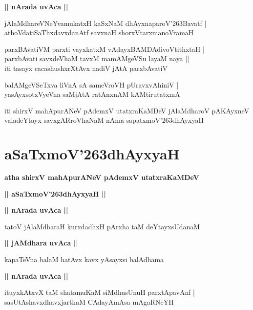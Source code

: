 \documentclass[twoside,12pt,openright]{book}
\def\S{\char'263}
\newcounter{shloka}[chapter]
\def\uvaca#1{\centerline{{\large\textbf{#1}}}}
\begin{document}
\uvaca{|| nArada uvAca ||}

\begin{shloka}%
jAlaMdhareVNeYvamukatxH kaSxNaM dhAyxnaparoV\S Bavatf |\\
athoVdatiSaThxdavxdanAtf savxnaH shorxVtarxmanoVramaH
\end{shloka}

\begin{shloka}%
parxBAvatiVM parxti vayxkatxM vAdayxBAMDAdivoVtithxtaH |\\
parxbAvati savxdeVhaM tavxM mamAMgeVSu layaM naya ||\\
iti tasayx cacashushxrXtAvx nadiV jAtA parxbAvatiV 
\end{shloka}

\begin{shloka}%
balAMgeVSeTxva liVnA sA sameVroVH pUravxvAhiniV |\\
yasAyxsotxVyeVna saMjAtA ratAnxnAM kAMtirutatxmA 
\end{shloka}

\begin{center}
iti shirxV mahApurANeV pAdemxV utatxraKaMDeV jAlaMdharoV pAKAyxneV valadeYtayx savxgARroVhaNaM  nAma 
sapatxmoV\S dhAyxyaH 
\end{center}

\chapter{aSaTxmoV\S dhAyxyaH}

\begin{center}
{\LARGE\bfseries atha shirxV mahApurANeV pAdemxV utatxraKaMDeV} 
\end{center}

\begin{center}
{\LARGE\bfseries  || aSaTxmoV\S dhAyxyaH ||}
\end{center}

\uvaca{|| nArada uvAca ||}

\begin{shloka}%
tatoV jAlaMdharaH kurxdadhxH pArxha taM deYtayxsUdanaM 
\end{shloka}

\uvaca{|| jAMdhara uvAca ||}

\begin{shloka}%
kapaTeVna balaM hatAvx kavx yAsayxsi balAdhama 
\end{shloka}

\uvaca{|| nArada uvAca ||}

\begin{shloka}%
ituyxkAtxvX taM shatamuKaM siMdhusUnuH parxtApavAnf |\\
sasUtAshavxdhavxjarthaM CAdayAmAsa mAgaRNeYH 
\end{shloka}
\end{document}

